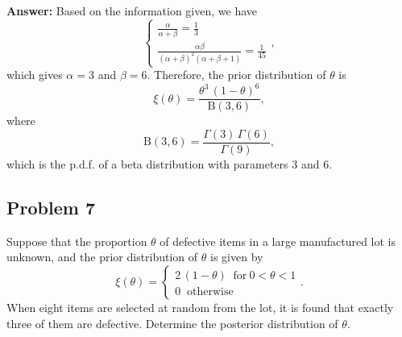 \documentclass{article}
\begin{document}
\textbf{Answer:} Based on the information given, we have
\begin{equation*}
	\begin{cases}
		\frac{\alpha}{\alpha + \beta} = \frac{1}{3}\\
		\frac{\alpha \beta}{(\alpha + \beta)^2(\alpha + \beta + 1)} = \frac{1}{45}
	\end{cases},
\end{equation*}
which gives $\alpha = 3$ and $\beta = 6$. Therefore, the prior distribution of $\theta$ is
\begin{equation*}
\xi(\theta) = \frac{\theta^3 \, (1 - \theta)^6}{\text{B}(3,6)},
\end{equation*}
where 
\begin{equation*}
\text{B}(3,6) = \frac{\Gamma(3) \, \Gamma(6)}{\Gamma(9)},
\end{equation*}
which is the p.d.f. of a beta distribution with parameters 3 and 6.


\bigskip

\subsection*{Problem 7}
Suppose that the proportion $\theta$ of defective items in a large manufactured lot is unknown, and the prior distribution of $\theta$ is given by
\begin{equation*}
	\xi(\theta) = \begin{cases}
		2\,(1 - \theta) \;\; \text{for} \: 0 < \theta < 1 \\
		0 \;\; \text{otherwise}
	\end{cases}.
\end{equation*}
When eight items are selected at random from the lot, it is found that exactly three of them are defective. Determine the posterior distribution of $\theta$. 

\
\end{document}
